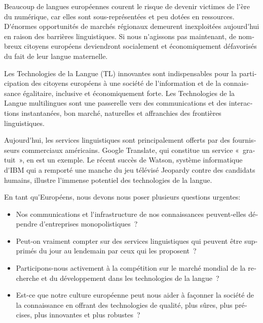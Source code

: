 \documentclass[]{../metanetpaper}
\begin{document}
\begin{french}


\begin{multicols}{2}

Beaucoup de langues européennes courent le risque de devenir victimes
de l{\mbox '}ère du numérique, car elles sont sous-représentées et peu
dotées en ressources. D{\mbox '}énormes opportunités de marchés
régionaux demeurent inexploitées aujourd{\mbox '}hui en raison des
barrières linguistiques. Si nous n{\mbox '}agissons pas maintenant, de
nombreux citoyens européens deviendront socialement et économiquement
défavorisés du fait de leur langue maternelle.

Les Technologies de la Langue (TL) innovantes sont indispensables pour
la participation des citoyens européens à une société de l{\mbox
  '}information et de la connaissance égalitaire, inclusive et
économiquement forte. Les Technologies de la Langue multilingues sont
une passerelle vers des communications et des interactions
instantanées, bon marché, naturelles et affranchies des frontières
linguistiques.

Aujourd{\mbox '}hui, les services linguistiques sont principalement offerts
par des fournisseurs commerciaux américains. Google Translate, qui
constitue un service «~gratuit~», en est un exemple. Le récent succès de
Watson, système informatique d{\mbox '}IBM qui a remporté une manche du
jeu télévisé Jeopardy contre des candidats humains, illustre
l{\mbox '}immense potentiel des technologies de la langue.

En tant qu{\mbox '}Européens, nous devons nous poser plusieurs
questions urgentes:

\begin{itemize}

\item Nos communications et l{\mbox '}infrastructure de nos connaissances
  peuvent-elles dépendre d{\mbox '}entreprises monopolistiques~?

\item Peut-on vraiment compter sur des services linguistiques qui
  peuvent être supprimés du jour au lendemain par ceux qui les
  proposent~?

\item Participons-nous activement à la compétition sur le marché
  mondial de la recherche et du développement dans les technologies de
  la langue~?

\item Est-ce que notre culture européenne peut nous aider à façonner
  la société de la connaissance en offrant des technologies de qualité,
  plus sûres, plus précises, plus innovantes et plus robustes~?


\end{itemize}
\end{multicols}
\end{french}
\end{document}
